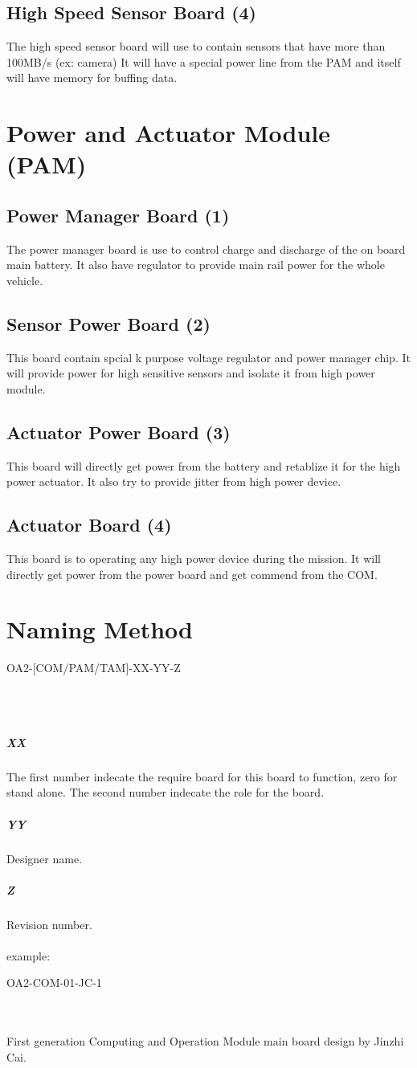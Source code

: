 \documentclass[12pt,article]{memoir}
\begin{document}
\subsection{High Speed Sensor Board (4)}
The high speed sensor board will use to contain sensors that have more than 100MB/s (ex: camera) It will have a special power line from the PAM and itself will have memory for buffing data.
\section{Power and Actuator Module (PAM)}
\subsection{Power Manager Board (1)}
The power manager board is use to control charge and discharge of the on board main battery. It also have regulator to provide main rail power for the whole vehicle.
\subsection{Sensor Power Board (2)}
This board contain spcial k purpose voltage regulator and power manager chip. It will provide power for high sensitive sensors and isolate it from high power module.
\subsection{Actuator Power Board (3)}
This board will directly get power from the battery and retablize it for the high power actuator. It also try to provide jitter from high power device.
\subsection{Actuator Board (4)}
This board is to operating any high power device during the mission. It will directly get power from the power board and get commend from the COM.
\newpage
\section{Naming Method}
\begin{LARGE}
OA2-[COM/PAM/TAM]-XX-YY-Z
\end{LARGE}\\\\
\subparagraph{XX}
The first number indecate the require board for this board to function, zero for stand alone. The second number indecate the role for the board.
\subparagraph{YY}
Designer name.
\subparagraph{Z}
Revision number.\\\\
example: 
\begin{large}
OA2-COM-01-JC-1
\end{large}\\\\
First generation Computing and Operation Module main board design by Jinzhi Cai.
\newpage
\end{document}
